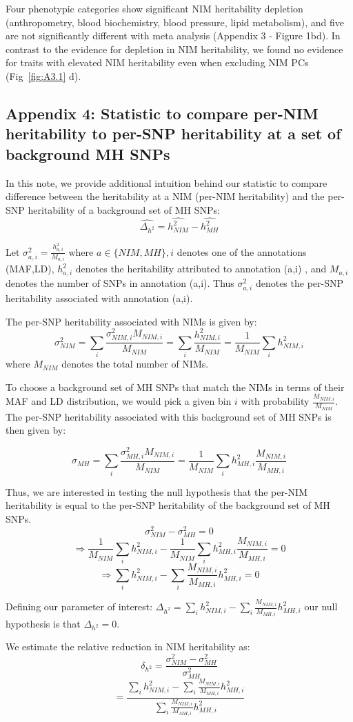 Four phenotypic categories show significant NIM heritability depletion (anthropometry, blood biochemistry, blood pressure, lipid metabolism), and five are not significantly different with meta analysis (Appendix 3 - Figure 1bd). In contrast to the evidence for depletion in NIM heritability, we found no evidence for traits with elevated NIM heritability even when excluding NIM PCs (Fig~\ref{fig:A3.1} d).

\subsection{Appendix 4: Statistic to compare per-NIM heritability to per-SNP heritability at a set of background MH SNPs}
\label{asec:4}
In this note, we provide additional intuition behind our statistic to compare difference between the heritability at a NIM (per-NIM heritability) and the per-SNP heritability of a background set of MH SNPs:
$$ \hat{\Delta_{h^2}} = \hat{h^2_{NIM}} - \hat{h_{MH}^2}$$

Let $\sigma^2_{a,i} = \frac{h^2_{a,i}}{M_{a,i}}$ where $a \in\{NIM,MH\},i$  denotes one of the annotations (MAF,LD), $h_{a,i}^2$ denotes the heritability attributed to annotation (a,i) , and $M_{a,i}$ denotes the number of SNPs in annotation (a,i). Thus $\sigma_{a,i}^2$ denotes the per-SNP heritability associated with annotation (a,i). 

The per-SNP heritability associated with NIMs is given by:
$$\sigma_{NIM}^2 = \sum_i \frac{\sigma_{NIM,i}^2 M_{NIM,i}}{M_{NIM}} = \sum_i \frac{h_{NIM,i}^2}{M_{NIM}} = \frac{1}{M_{NIM}} \sum_i h_{NIM,i}^2$$  
where $M_{NIM}$ denotes the total number of NIMs.

To choose a background set of MH SNPs that match the NIMs in terms of their MAF and LD distribution, we would pick a given bin $i$ with probability $\frac{M_{NIM,i}}{M_{NIM}}$. The per-SNP heritability associated with this background set of MH SNPs is then given by:

$$\sigma_{MH} = \sum_i \frac{\sigma_{MH,i}^2 M_{NIM,i}}{M_{NIM}}  = \frac{1}{M_{NIM}} \sum_i h_{MH,i}^2 \frac{M_{NIM,i}}{M_{MH,i}}$$ 

Thus, we are interested in testing the null hypothesis that the per-NIM heritability is equal to the per-SNP heritability of the background set of MH SNPs.
$$\sigma_{NIM}^2  - \sigma_{MH}^2  =0$$ 
$$\Rightarrow \frac{1}{M_{NIM}}  \sum_i h_{NIM,i}^2 - \frac{1}{M_{NIM}} \sum_i h_{MH,i}^2 \frac{M_{NIM,i}}{M_{MH,i}} = 0$$
$$\Rightarrow \sum_i h_{NIM,i}^2 - \sum_i \frac{M_{NIM,i}}{M_{MH,i}}h_{MH,i}^2 = 0 $$

Defining our parameter of interest: $\Delta_{h^2} =\sum_i h_{NIM,i}^2  - \sum_i \frac{M_{NIM,i}}{M_{MH,i}}h_{MH,i}^2$ 
our null  hypothesis is that $\Delta_{h^2} = 0$.

We estimate the relative reduction in NIM heritability as:
$$\delta_{h^2}  = \frac{\sigma_{NIM}^2-\sigma_{MH}^2}{\sigma_{MH}^2}$$
$$= \frac{\sum_i h_{NIM,i}^2  - \sum_i \frac{M_{NIM,i}}{M_{MH,i}}h_{MH,i}^2}{\sum_i \frac{M_{NIM,i}}{M_{MH,i}}h_{MH,i}^2}$$



